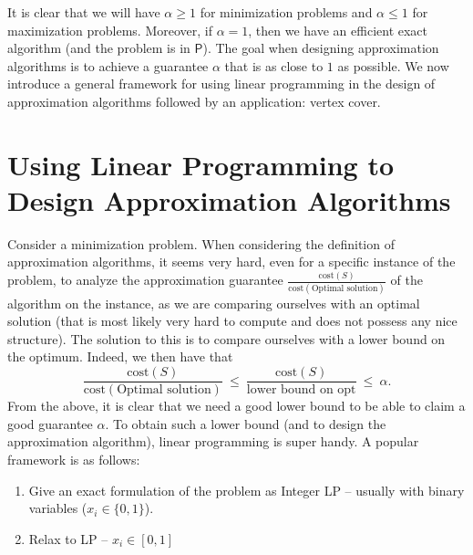 It is clear that we will have $\alpha\ge 1$ for minimization problems and $\alpha\le 1$ for
maximization problems. Moreover, if $\alpha=1$, then we have an efficient exact algorithm (and the
problem is in $\mathsf{P}$). The goal when designing approximation algorithms is to achieve a
guarantee $\alpha$ that is as close to $1$ as possible. We now introduce a general framework for
using linear programming in the design of approximation algorithms followed by an application:
vertex cover.

\section{Using Linear Programming to Design Approximation Algorithms}

Consider a minimization problem. When considering the definition of approximation algorithms, it
seems very hard, even for a specific instance of the problem, to analyze the approximation guarantee
$\frac{\mathrm{cost}(S)}{\mathrm{cost}(\text{Optimal solution})}$ of the algorithm on the instance,
as we are comparing ourselves with an optimal solution (that is most likely very hard to compute and
does not possess any nice structure). The solution to this is to compare ourselves with a lower bound
on the optimum. Indeed, we then have that
\[
  \frac{\mathrm{cost}(S)}{\mathrm{cost}(\text{Optimal solution})}
  \ \le\ \frac{\mathrm{cost}(S)}{\text{lower bound on opt}}\ \le\ \alpha.
\]
From the above, it is clear that we need a good lower bound to be able to claim a good guarantee
$\alpha$. To obtain such a lower bound (and to design the approximation algorithm), linear
programming is super handy. A popular framework is as follows:
\begin{enumerate}
  \item Give an exact formulation of the problem as Integer LP -- usually with binary variables
    ($x_i\in\{0,1\}$).
  \item Relax to LP -- $x_i\in[0,1]$
\end{enumerate}

\begin{center}
\end{center}

